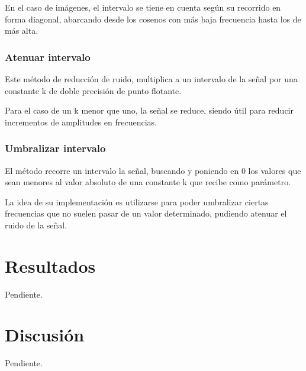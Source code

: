 \documentclass[a4paper,10pt,twoside]{article}
\begin{document}
En el caso de imágenes, el intervalo se tiene en cuenta según su recorrido en forma diagonal, abarcando desde los cosenos con más baja frecuencia hasta los de más alta.

\subsubsection{Atenuar intervalo}
Este método de reducción de ruido, multiplica a un intervalo de la señal por una constante k de doble precisión de punto flotante.

Para el caso de un k menor que uno, la señal se reduce, siendo útil para reducir incrementos de amplitudes en frecuencias.

\subsubsection{Umbralizar intervalo}
El método recorre un intervalo la señal, buscando y poniendo en 0 los valores que sean menores al valor absoluto de una constante k que recibe como parámetro.

La idea de su implementación es utilizarse para poder umbralizar ciertas frecuencias que no suelen pasar de un valor determinado, pudiendo atenuar el ruido de la señal.



\section{Resultados}
Pendiente.



\section{Discusión}
Pendiente.

\end{document}
